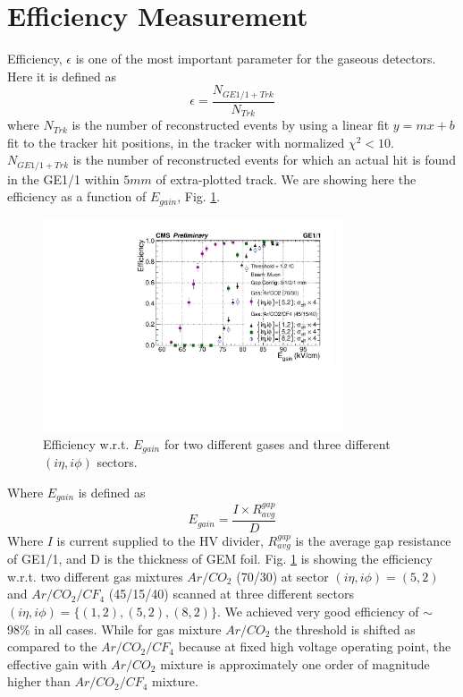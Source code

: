 \section{Efficiency Measurement}
Efficiency, $\epsilon$ is one of the most important parameter for the gaseous detectors. Here it is defined as 
\begin{equation}
\epsilon = \frac{N_{GE1/1+Trk}}{N_{Trk}}
\end{equation}
where $N_{Trk}$ is the number of reconstructed events by using a linear fit $y = mx + b$ fit to the tracker hit positions, in the tracker with normalized $\chi^2<10$.
$N_{GE1/1+Trk}$ is the number of reconstructed events for which an actual hit is found in the GE1/1 within $5mm$ of extra-plotted track.
We are showing here the efficiency as a function of $E_{gain}$, Fig. \ref{Efficiency}. 
\begin{figure}[!h]
\centering
\includegraphics[width=3.5in]{figures/GEM/EfficiencyPlot_wrt_EGain_wError4times_2gas.pdf}
\caption{Efficiency w.r.t. $E_{gain}$ for two different gases and three different $(i\eta,i\phi)$ sectors.}
\label{Efficiency}
\end{figure}
Where $E_{gain}$ is defined as
\begin{equation}
E_{gain} = \frac{I\times R_{avg}^{gap}}{D}
\end{equation}
Where $I$ is current supplied to the HV divider,
      $R_{avg}^{gap}$ is the average gap resistance of GE1/1,
      and D is the thickness of GEM foil.
      Fig. \ref{Efficiency} is showing the efficiency w.r.t. two different gas mixtures $Ar/CO_2$ (70/30) at sector $(i\eta,i\phi)=(5,2)$ and $Ar/CO_2/CF_4$ (45/15/40) scanned at three different sectors $(i\eta,i\phi)=\{(1,2),(5,2),(8,2)\}$. We achieved very good efficiency of $\sim$ 98\% in all cases. While for gas mixture $Ar/CO_2$ the threshold is shifted as compared to the $Ar/CO_2/CF_4$ because at fixed high voltage operating point, the effective gain with $Ar/CO_2$  mixture is approximately one order of magnitude higher than $Ar/CO_2/CF_4$ mixture.
      

